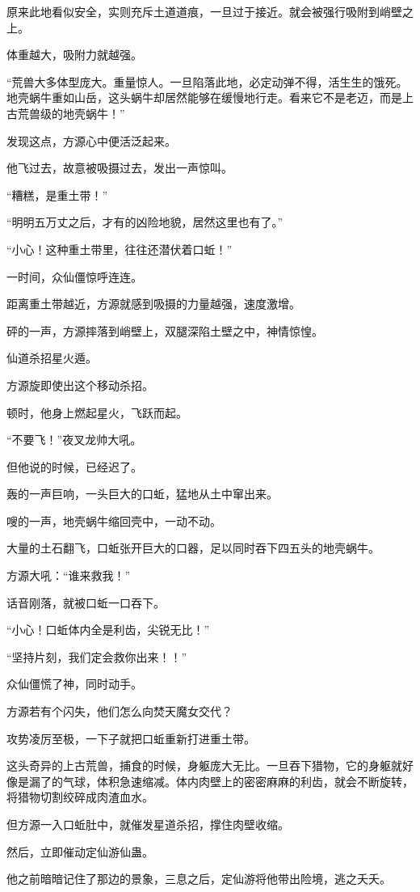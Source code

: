 \begin{this_body}
原来此地看似安全，实则充斥土道道痕，一旦过于接近。就会被强行吸附到峭壁之上。

体重越大，吸附力就越强。

“荒兽大多体型庞大。重量惊人。一旦陷落此地，必定动弹不得，活生生的饿死。地壳蜗牛重如山岳，这头蜗牛却居然能够在缓慢地行走。看来它不是老迈，而是上古荒兽级的地壳蜗牛！”

发现这点，方源心中便活泛起来。

他飞过去，故意被吸摄过去，发出一声惊叫。

“糟糕，是重土带！”

“明明五万丈之后，才有的凶险地貌，居然这里也有了。”

“小心！这种重土带里，往往还潜伏着口蚯！”

一时间，众仙僵惊呼连连。

距离重土带越近，方源就感到吸摄的力量越强，速度激增。

砰的一声，方源摔落到峭壁上，双腿深陷土壁之中，神情惊惶。

仙道杀招星火遁。

方源旋即使出这个移动杀招。

顿时，他身上燃起星火，飞跃而起。

“不要飞！”夜叉龙帅大吼。

但他说的时候，已经迟了。

轰的一声巨响，一头巨大的口蚯，猛地从土中窜出来。

嗖的一声，地壳蜗牛缩回壳中，一动不动。

大量的土石翻飞，口蚯张开巨大的口器，足以同时吞下四五头的地壳蜗牛。

方源大吼：“谁来救我！”

话音刚落，就被口蚯一口吞下。

“小心！口蚯体内全是利齿，尖锐无比！”

“坚持片刻，我们定会救你出来！！”

众仙僵慌了神，同时动手。

方源若有个闪失，他们怎么向焚天魔女交代？

攻势凌厉至极，一下子就把口蚯重新打进重土带。

这头奇异的上古荒兽，捕食的时候，身躯庞大无比。一旦吞下猎物，它的身躯就好像是漏了的气球，体积急速缩减。体内肉壁上的密密麻麻的利齿，就会不断旋转，将猎物切割绞碎成肉渣血水。

但方源一入口蚯肚中，就催发星道杀招，撑住肉壁收缩。

然后，立即催动定仙游仙蛊。

他之前暗暗记住了那边的景象，三息之后，定仙游将他带出险境，逃之夭夭。


\end{this_body}
